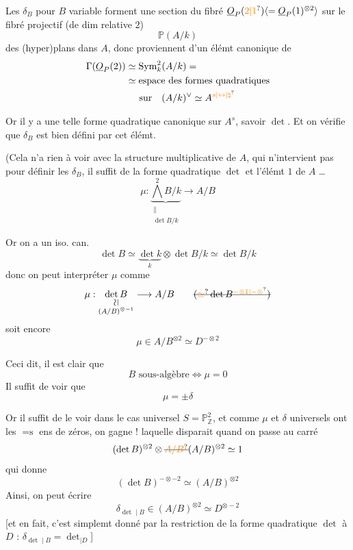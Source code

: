  Les $\delta_B$ pour $B$ variable forment une section du fibré $\underline{O}_P(\unsure{2|1})\inserted{=\underline{O}_P(1)^{\otimes2}}$ sur le fibré projectif (de dim relative $2$)
\[
\mathbb{P}(A/k)
\]
des (hyper)plans dans $A$, donc proviennent d'un élémt canonique de
\[
\begin{aligned}
\Gamma(\underline{O}_P(2))&\simeq\operatorname{Sym}^2_k(A/k)=\\
&\simeq\text{espace des formes quadratiques}\\
&\hspace{1.4em}\text{sur}\quad(A/k)^\vee\simeq A^{\unsure{s|\leftrightarrow|\natural}}
\end{aligned}
\]

Or il y a une telle forme quadratique canonique sur $A^s$, savoir $\det$. Et on vérifie que $\delta_B$ est bien défini par cet élémt.

(Cela n'a rien à voir avec la structure multiplicative de $A$, qui n'intervient pas pour définir les $\delta_B$, il suffit de la forme quadratique  $\det$ et l'élémt $1$ de $A$  \ldots
\[
\mu:\underbrace{\bigwedge^2 B/k}_{\substack{\parallel\\\det B/k}}\longrightarrow A/B
\]

Or on a un iso. can.
\[
\det B\simeq\underbrace{\det k}_{k}\otimes\det B/k\simeq\det B/k
\]
donc on peut interpréter $\mu$ comme
\[
\mu:\underset{\substack{\rotatebox{90}{$\simeq$}\\(A/B)^{\otimes-1}}}{\det B}\longrightarrow A/B
\qquad\deleted{(\unsure{\simeq}\det B^{\unsure{-\otimes1|-\otimes}})}
\]
soit encore
\[
\mu\in A/B^{\otimes2}\simeq D^{-\otimes2}
\]

Ceci dit, il est clair que
\[
B\text{ sous-algèbre}\Longleftrightarrow\mu=0
\]
Il suffit de voir que
\[
\mu=\pm\delta
\]

Or il suffit de le voir dans le cas universel $S=\mathbb{P}^2_{\mathbb{Z}}$, et comme   $\mu$ et $\delta$  universels ont les $=\text{s}$  ens de zéros, on gagne !
laquelle disparait quand on passe au carré
\[
(\det B)^{\otimes2}\otimes\deleted{\unsure{A/B}}(A/B)^{\otimes2}\simeq1
\]
qui donne
\[
(\det B)^{-\otimes-2}\simeq(A/B)^{\otimes2}
\]
Ainsi, on peut écrire
\[
\delta_{\det\mid B}\in(A/B)^{\otimes2}\simeq D^{\otimes-2}
\]
[et en fait, c'est simplemt donné par la restriction de la forme quadratique $\det$ à $D$ : $\delta_{\det\mid B}=\det_{\mid D}$]


